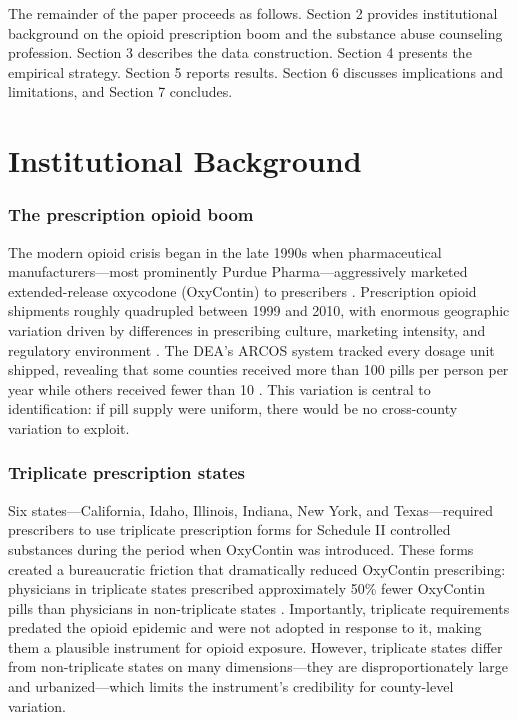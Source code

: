 \documentclass[12pt]{article}
\begin{document}
The remainder of the paper proceeds as follows. Section 2 provides institutional background on the opioid prescription boom and the substance abuse counseling profession. Section 3 describes the data construction. Section 4 presents the empirical strategy. Section 5 reports results. Section 6 discusses implications and limitations, and Section 7 concludes.


\section{Institutional Background}

\subsubsection*{The prescription opioid boom} The modern opioid crisis began in the late 1990s when pharmaceutical manufacturers---most prominently Purdue Pharma---aggressively marketed extended-release oxycodone (OxyContin) to prescribers \citep{vanZee2009, meier2003}. Prescription opioid shipments roughly quadrupled between 1999 and 2010, with enormous geographic variation driven by differences in prescribing culture, marketing intensity, and regulatory environment \citep{guy2017}. The DEA's ARCOS system tracked every dosage unit shipped, revealing that some counties received more than 100 pills per person per year while others received fewer than 10 \citep{arcos2019}. This variation is central to identification: if pill supply were uniform, there would be no cross-county variation to exploit.

\subsubsection*{Triplicate prescription states} Six states---California, Idaho, Illinois, Indiana, New York, and Texas---required prescribers to use triplicate prescription forms for Schedule II controlled substances during the period when OxyContin was introduced. These forms created a bureaucratic friction that dramatically reduced OxyContin prescribing: physicians in triplicate states prescribed approximately 50\% fewer OxyContin pills than physicians in non-triplicate states \citep{alpert2022}. Importantly, triplicate requirements predated the opioid epidemic and were not adopted in response to it, making them a plausible instrument for opioid exposure. However, triplicate states differ from non-triplicate states on many dimensions---they are disproportionately large and urbanized---which limits the instrument's credibility for county-level variation.
\end{document}
